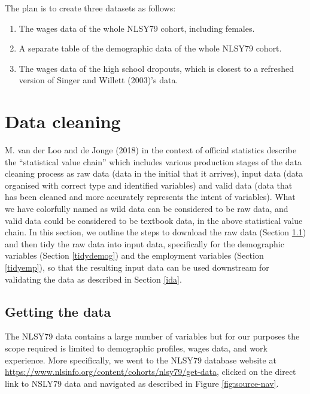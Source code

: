 \documentclass{article}
\providecommand{\tightlist}{%
  \setlength{\itemsep}{0pt}\setlength{\parskip}{0pt}}
\begin{document}
The plan is to create three datasets as follows:

\begin{enumerate}
\def\labelenumi{\arabic{enumi}.}
\tightlist
\item
  The wages data of the whole NLSY79 cohort, including females.
\item
  A separate table of the demographic data of the whole NLSY79 cohort.
\item
  The wages data of the high school dropouts, which is closest to a refreshed version of Singer and Willett (2003)'s data.
\end{enumerate}

\hypertarget{cleaning}{%
\section{Data cleaning}\label{cleaning}}

M. van der Loo and de Jonge (2018) in the context of official statistics describe the ``statistical value chain'' which includes various production stages of the data cleaning process as raw data (data in the initial that it arrives), input data (data organised with correct type and identified variables) and valid data (data that has been cleaned and more accurately represents the intent of variables). What we have colorfully named as wild data can be considered to be raw data, and valid data could be considered to be textbook data, in the above statistical value chain. In this section, we outline the steps to download the raw data (Section \ref{getdata}) and then tidy the raw data into input data, specifically for the demographic variables (Section \ref{tidydemog}) and the employment variables (Section \ref{tidyemp}), so that the resulting input data can be used downstream for validating the data as described in Section \ref{ida}.

\hypertarget{getdata}{%
\subsection{Getting the data}\label{getdata}}

The NLSY79 data contains a large number of variables but for our purposes the scope required is limited to demographic profiles, wages data, and work experience. More specifically, we went to the NLSY79 database website at \url{https://www.nlsinfo.org/content/cohorts/nlsy79/get-data}, clicked on the direct link to NSLY79 data and navigated as described in Figure \ref{fig:source-nav}.
\end{document}
